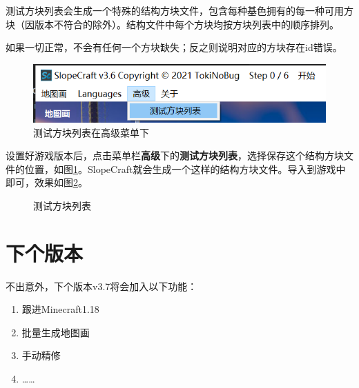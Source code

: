 \documentclass[UTF8]{ctexart}
\begin{document}
    测试方块列表会生成一个特殊的结构方块文件，包含每种基色拥有的每一种可用方块（因版本不符合的除外）。结构文件中每个方块均按方块列表中的顺序排列。
    
    如果一切正常，不会有任何一个方块缺失；反之则说明对应的方块存在id错误。
    
    \begin{figure}[htbp]
        \centering
        \includegraphics[width=15cm]{Img9_TestBlockList.png}
        \caption{测试方块列表在高级菜单下}
        \label{locOfTestBlockList}
    \end{figure}

    设置好游戏版本后，点击菜单栏\textbf{高级}下的\textbf{测试方块列表}，选择保存这个结构方块文件的位置，如图\ref*{locOfTestBlockList}。SlopeCraft就会生成一个这样的结构方块文件。导入到游戏中即可，效果如图\ref*{testBlockListNBT}。

    \begin{figure}[htbp]
        \centering
        \caption{测试方块列表}
        \label{testBlockListNBT}
    \end{figure}

\section{下个版本}
    不出意外，下个版本v3.7将会加入以下功能：
    \begin{enumerate}
        \item 跟进Minecraft1.18
        \item 批量生成地图画
        \item 手动精修
        \item ……
    \end{enumerate}
\end{document}
